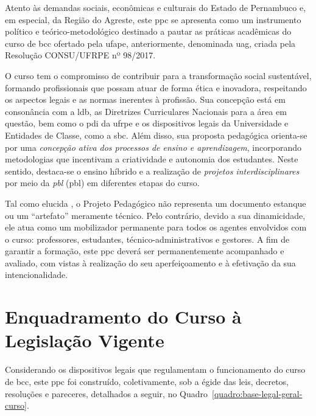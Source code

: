 \documentclass[
	12pt,				%
	openright,			%
  oneside,     %
	a4paper,			%
 hyphens,
	chapter=TITLE,		%
	english,			%
	french,				%
	spanish,			%
	brazil				%
	]{abntex2}
\begin{document}
Atento às demandas sociais, econômicas e culturais do Estado de Pernambuco e, em especial, da Região do Agreste, este \acrfull{ppc} se apresenta como um instrumento político e teórico-metodológico destinado a pautar as práticas acadêmicas do curso de \acrfull{bcc} ofertado pela \acrshort{ufape}, anteriormente, denominada \acrfull{uag}, criada pela Resolução CONSU/UFRPE nº 98/2017.

O curso tem o compromisso de contribuir para a transformação social sustentável, formando profissionais que possam atuar de forma ética e inovadora, respeitando os aspectos legais e as normas inerentes à profissão. Sua concepção está em consonância com a \acrfull{ldb}, as Diretrizes Curriculares Nacionais para a área em questão, bem como o \acrfull{pdi} da \acrshort{ufrpe} e os dispositivos legais da Universidade e Entidades de Classe, como a \acrfull{sbc}. Além disso, sua proposta pedagógica orienta-se por uma \textit{concepção ativa dos processos de ensino e aprendizagem}, incorporando metodologias que incentivam a criatividade e autonomia dos estudantes. Neste sentido, destaca-se o ensino híbrido e a realização de \textit{projetos interdisciplinares} por meio da \textit{\acrlong{pbl}} (\acrshort{pbl}) em diferentes etapas do curso.

Tal como elucida , o Projeto Pedagógico não representa um documento estanque ou um ``artefato'' meramente técnico. Pelo contrário, devido a sua dinamicidade, ele atua como um mobilizador permanente para todos os agentes envolvidos com o curso: professores, estudantes, técnico-administrativos e gestores. A fim de garantir a formação, este \acrshort{ppc} deverá ser permanentemente acompanhado e avaliado, com vistas à realização do seu aperfeiçoamento e à efetivação da sua intencionalidade.



\chapter{Enquadramento do Curso à Legislação Vigente}

Considerando os dispositivos legais que regulamentam o funcionamento do curso de \acrlong{bcc}, este \acrlong{ppc} foi construído, coletivamente, sob a égide das leis, decretos, resoluções e pareceres, detalhados a seguir, no Quadro~\ref{quadro:base-legal-geral-curso}.
\end{document}

